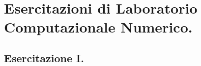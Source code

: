 \begin{comment}

\begin{codice}
\begin{verbatim}

\end{verbatim}
\end{codice}

\end{comment}

\chapter{Esercitazioni di Laboratorio Computazionale Numerico.}

\section{Esercitazione I.}

